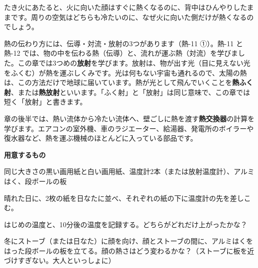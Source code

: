 
\begin{hatena}
\noindent\begin{minipage}[c]{0.60\linewidth}\raggedright
たき火にあたると、火に向いた顔はすぐに熱くなるのに、背中はひんやりしたままです。周りの空気はどちらも冷たいのに、なぜ火に向いた側だけが熱くなるのでしょう。
\end{minipage}\hfill
\begin{minipage}[c]{0.36\linewidth}\centering
{}
\end{minipage}
\end{hatena}

\noindent 熱の伝わり方には、伝導・対流・放射の3つがあります（熱-11 ①）。熱-11 と熱-12 では、物の中を伝わる熱（伝導）と、流れが運ぶ熱（対流）を学びました。この章では3つめの\textbf{放射}を学びます。放射は、物が出す光（目に見えない光をふくむ）が熱を運ぶしくみです。光は何もない宇宙も通れるので、太陽の熱は、この方法だけで地球に届いています。熱が光として飛んでいくことを\textbf{熱ふく射}、または\textbf{熱放射}といいます。「ふく射」と「放射」は同じ意味で、この章では短く「放射」と書きます。

章の後半では、熱い流体から冷たい流体へ、壁ごしに熱を渡す\textbf{熱交換器}の計算を学びます。エアコンの室外機、車のラジエーター、給湯器、発電所のボイラーや復水器など、熱を運ぶ機械のほとんどに入っている部品です。

\begin{yattemiyou}
\textbf{用意するもの}\par
同じ大きさの黒い画用紙と白い画用紙、温度計2本（または放射温度計）、アルミはく、段ボールの板
\begin{enumerate}[label={\bkcircled[bkGreen]{\arabic*}}, leftmargin=2.4\zw, itemsep=1pt, topsep=2pt]
\item 晴れた日に、2枚の紙を日なたに並べ、それぞれの紙の下に温度計の先を差しこむ。
\item はじめの温度と、10分後の温度を記録する。どちらがどれだけ上がったかな？
\item 冬にストーブ（または日なた）に顔を向け、顔とストーブの間に、アルミはくをはった段ボールの板を立てる。顔の熱さはどう変わるかな？（ストーブに板を近づけすぎない。大人といっしょに）
\end{enumerate}
\end{yattemiyou}

